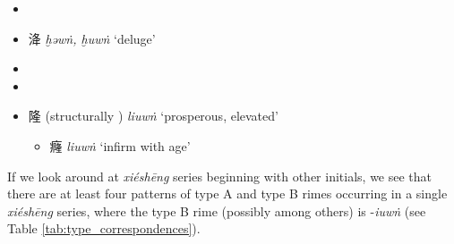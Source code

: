 \begin{itemize}
    \item  {} %

    \item {\Large{洚}} %
    {} \textit{ḫəwṅ, ḫuwṅ} `deluge' %

 \item {} %

\item {} %




  



    \item {\Large{隆}} %
(structurally 
    \makebox[1.25em][l]{\raisebox{-0.2em}{}})
    \textit{liuwṅ} `prosperous, elevated' %
\begin{itemize}
    \item {\Large{癃}} %
    \textit{liuwṅ} `infirm with age' %
\end{itemize}
\end{itemize}






  




If we look around at \textit{xiéshēng} series beginning with other initials, we see that there are at least four patterns of type A and type B rimes occurring in a single \textit{xiéshēng} series, where the type B rime (possibly among others) is -\textit{iuwṅ} (see Table \ref{tab:type_correspondences}).  



